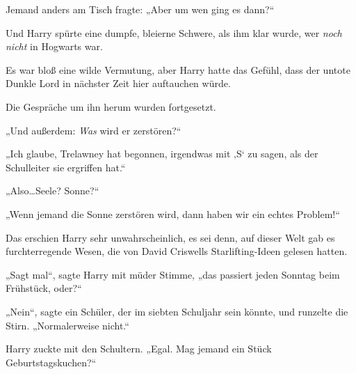 Jemand anders am Tisch fragte: „Aber um wen ging es dann?“

Und Harry spürte eine dumpfe, bleierne Schwere, als ihm klar wurde, wer \emph{noch nicht} in Hogwarts war.

Es war bloß eine wilde Vermutung, aber Harry hatte das Gefühl, dass der untote Dunkle Lord in nächster Zeit hier auftauchen würde.

Die Gespräche um ihn herum wurden fortgesetzt.

„Und außerdem: \emph{Was} wird er zerstören?“

„Ich glaube, Trelawney hat begonnen, irgendwas mit ‚S‘ zu sagen, als der Schulleiter sie ergriffen hat.“

„Also…Seele? Sonne?“

„Wenn jemand die Sonne zerstören wird, dann haben wir ein echtes Problem!“

Das erschien Harry sehr unwahrscheinlich, es sei denn, auf dieser Welt gab es furchterregende Wesen, die von David Criswells Starlifting-Ideen gelesen hatten.

„Sagt mal“, sagte Harry mit müder Stimme, „das passiert jeden Sonntag beim Frühstück, oder?“

„Nein“, sagte ein Schüler, der im siebten Schuljahr sein könnte, und runzelte die Stirn. „Normalerweise nicht.“

Harry zuckte mit den Schultern. „Egal. Mag jemand ein Stück Geburtstagskuchen?“

